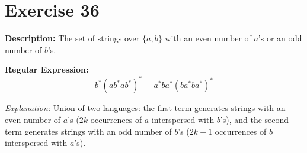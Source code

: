 \documentclass[12pt]{article}
\newcommand{\exercisedescription}[1]{%
    \Needspace{4\baselineskip}%
    \noindent\textbf{Description:} #1\par
    \vspace{0.25cm}
}
\newcommand{\reexpression}[1]{%
    \noindent\textbf{Regular Expression:}
    \vspace{-0.25cm}
    \begin{equation*}
        #1
    \end{equation*}
    \vspace{-0.15cm}
}
\newcommand{\reexplanation}[1]{%
    \noindent\textit{Explanation:} #1\par
    \vspace{0.55cm}
}
\begin{document}

\section*{Exercise 36}
\exercisedescription{%
    The set of strings over $\{a,b\}$ with an even number of $a$'s or an odd number of $b$'s.
}
\reexpression{%
    b^* (a b^* a b^*)^* \;\mid\; a^* b a^* (b a^* b a^*)^*
}
\reexplanation{%
    Union of two languages: the first term generates strings with an even number of $a$'s ($2k$ occurrences of $a$ interspersed with $b$'s), and the second term generates strings with an odd number of $b$'s ($2k+1$ occurrences of $b$ interspersed with $a$'s).
}
\end{document}
